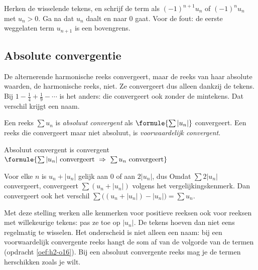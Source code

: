 \begin{werkwijze}
Herken de wisselende tekens, en schrijf de term als $(-1)^{n+1} u_n$ of $(-1)^n u_n$ met $u_n > 0$. Ga na dat $u_n$ daalt en naar 0 gaat. Voor de fout: de eerste weggelaten term $u_{n+1}$ is een bovengrens.
\end{werkwijze}


\begin{oefeningen}
\end{oefeningen}

\subsection{Absolute convergentie}

De alternerende harmonische reeks convergeert, maar de reeks van haar absolute waarden, de harmonische reeks, niet. Ze convergeert dus alleen dankzij de tekens. Bij $1 - \tfrac14 + \tfrac19 - \cdots$ is het anders: die convergeert ook zonder de mintekens. Dat verschil krijgt een naam.

\begin{theorie}
Een reeks $\sum u_n$ is \emph{absoluut convergent} als $\formule{\sum |u_n|}$ convergeert. Een reeks die convergeert maar niet absoluut, is \emph{voorwaardelijk convergent}.

\begin{stelling}{Absoluut convergent is convergent}
\qquad $\formule{\sum |u_n| \text{ convergeert} \ \Rightarrow \ \sum u_n \text{ convergeert}}$
\end{stelling}

\begin{bewijs}
Voor elke $n$ is $u_n + |u_n|$ gelijk aan 0 of aan $2|u_n|$, dus
Omdat $\sum 2|u_n|$ convergeert, convergeert $\sum (u_n + |u_n|)$ volgens het vergelijkingskenmerk. Dan convergeert ook het verschil $\sum \bigl((u_n + |u_n|) - |u_n|\bigr) = \sum u_n$.
\end{bewijs}
\end{theorie}

Met deze stelling werken alle kenmerken voor positieve reeksen ook voor reeksen met willekeurige tekens: pas ze toe op $|u_n|$. De tekens hoeven dan niet eens regelmatig te wisselen. Het onderscheid is niet alleen een naam: bij een voorwaardelijk convergente reeks hangt de som af van de volgorde van de termen (opdracht \ref{oef:h2-o16}). Bij een absoluut convergente reeks mag je de termen herschikken zoals je wilt.


